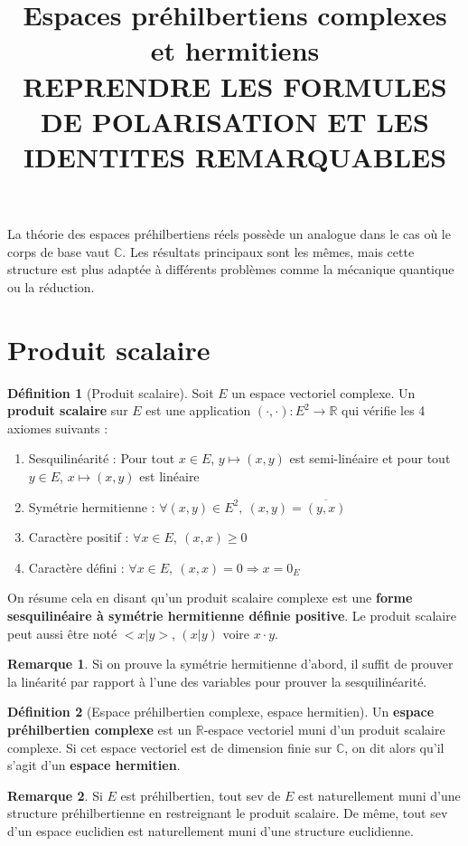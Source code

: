\documentclass[french]{article}
\title{Espaces préhilbertiens complexes et hermitiens \\  REPRENDRE LES FORMULES DE POLARISATION ET LES IDENTITES REMARQUABLES}
\newcommand{\R}{\mathbb{R}}
\newcommand{\C}{\mathbb{C}}
\theoremstyle{plain}
\theoremstyle{definition}
\newtheorem{dfn}{Définition}
\newtheorem{rmq}{Remarque}
\begin{document}
\maketitle

La théorie des espaces préhilbertiens réels possède un analogue dans le cas où le corps de base vaut $\C$. Les résultats principaux sont les mêmes, mais cette structure est plus adaptée à différents problèmes comme la mécanique quantique ou la réduction. 

\section{Produit scalaire}
\begin{dfn}[Produit scalaire]
	Soit $E$ un espace vectoriel complexe. Un \textbf{produit scalaire} sur $E$ est une application $(\cdot,\cdot):E^2\rightarrow\R$ qui vérifie les 4 axiomes suivants :
	\begin{enumerate}
		\item Sesquilinéarité : Pour tout $x\in E$, $y\mapsto(x,y)$ est semi-linéaire et pour tout $y\in E$, $x\mapsto(x,y)$ est linéaire
		\item Symétrie hermitienne : $\forall(x,y)\in E^2,\ (x,y)=\overline{(y,x)}$
		\item Caractère positif : $\forall x\in E,\ (x,x) \geqslant 0$
		\item Caractère défini : $\forall x\in E,\ (x,x)=0 \Longrightarrow x=0_E$
	\end{enumerate} On résume cela en disant qu'un produit scalaire complexe est une \textbf{forme sesquilinéaire à symétrie hermitienne définie positive}. Le produit scalaire peut aussi être noté $<x|y>$, $(x|y)$ voire $x\cdot y$.
\end{dfn}
\begin{rmq} Si on prouve la symétrie hermitienne d'abord, il suffit de prouver la linéarité par rapport à l'une des variables pour prouver la sesquilinéarité. \end{rmq}
\begin{dfn}[Espace préhilbertien complexe, espace hermitien]
	Un \textbf{espace préhilbertien complexe} est un $\R$-espace vectoriel muni d'un produit scalaire complexe. Si cet espace vectoriel est de dimension finie sur $\C$, on dit alors qu'il s'agit d'un \textbf{espace hermitien}.
\end{dfn}
\begin{rmq} Si $E$ est préhilbertien, tout sev de $E$ est naturellement muni d'une structure préhilbertienne en restreignant le produit scalaire. De même, tout sev d'un espace euclidien est naturellement muni d'une structure euclidienne. \end{rmq}
\end{document}
